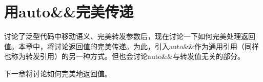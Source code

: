 \chapter{用auto\&\&完美传递}
讨论了泛型代码中移动语义、完美转发参数后，现在讨论一下如何完美处理返回值。本章中，将讨论返回值的完美传递。为此，引入auto\&\&作为通用引用（同样也称为转发引用）的另一种方式。但也会讨论auto\&\&与转发值无关的部分。

下一章将讨论如何完美地返回值。





